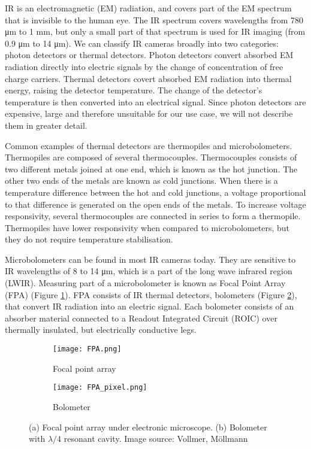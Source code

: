 IR is an electromagnetic (EM) radiation, and covers part of the EM spectrum that is invisible to the human eye.
The IR spectrum covers wavelengths from 780 \si{\micro\meter} to 1 \si{\milli\meter}, but only a small part of that spectrum is used for IR imaging (from 0.9 \si{\micro\meter} to 14 \si{\micro\meter})\cite{thermal_book}.
We can classify IR cameras broadly into two categories: photon detectors or thermal detectors\cite{thermal_book}.
Photon detectors convert absorbed EM radiation directly into electric signals by the change of concentration of free charge carriers\cite{thermal_book}.
Thermal detectors covert absorbed EM radiation into thermal energy, raising the detector temperature\cite{thermal_book}. 
The change of the detector's temperature is then converted into an electrical signal.
Since photon detectors are expensive, large and therefore unsuitable for our use case, we will not describe them in greater detail.

Common examples of thermal detectors are thermopiles and microbolometers. 
Thermopiles are composed of several thermocouples.
Thermocouples consists of two different metals joined at one end, which is known as the hot junction.
The other two ends of the metals are known as cold junctions.
When there is a temperature difference between the hot and cold junctions, a voltage proportional to that difference is generated on the open ends of the metals.
To increase voltage responsivity, several thermocouples are connected in series to form a thermopile\cite{thermal_book}.
Thermopiles have lower responsivity when compared to microbolometers, but they do not require temperature stabilisation\cite{thermal_book}.

Microbolometers can be found in most IR cameras today\cite{thermal_book}. 
They are sensitive to IR wavelengths of 8 to 14 \si{\micro\meter}, which is a part of the long wave infrared region (LWIR)\cite{thermal_book}.
Measuring part of a microbolometer is known as Focal Point Array (FPA) (Figure \ref{FPA}).
FPA consists of IR thermal detectors, bolometers (Figure \ref{FPA_pixel}), that convert IR radiation into an electric signal.
Each bolometer consists of an absorber material connected to a Readout Integrated Circuit (ROIC) over thermally insulated, but electrically conductive legs\cite{thermal_article}.
\newline

\begin{figure}[h]
    \begin{subfigure}{0.5\textwidth}
        \centering
        \texttt{[image: FPA.png]} 
        \caption{Focal point array}
        \label{FPA}
    \end{subfigure}
    \begin{subfigure}{0.5\textwidth}
        \centering
        \texttt{[image: FPA\_pixel.png]}
        \caption{Bolometer}
        \label{FPA_pixel}
    \end{subfigure}
    \caption[Focal point array and bolometer.] {(a) Focal point array under electronic microscope. (b) Bolometer with $\lambda /4$ resonant cavity. Image source: Vollmer, Möllmann\cite{thermal_book}}
    \label{FPA_microbolo}
\end{figure}
\clearpage

